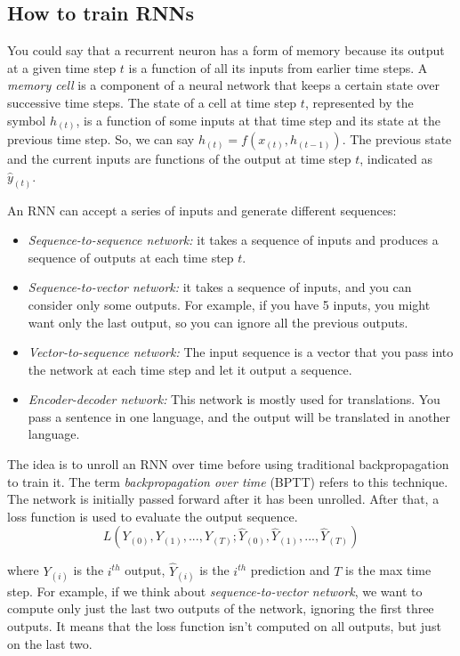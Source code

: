 \subsection{How to train RNNs}
You could say that a recurrent neuron has a form of memory because its output at a given time step $t$ is a function of all its inputs from earlier time steps. A \textit{memory cell} is a component of a neural network that keeps a certain state over successive time steps.
The state of a cell at time step $t$, represented by the symbol $h_{(t)}$, is a function of some inputs at that time step and its state at the previous time step.
So, we can say $h_{(t)} = f\left(x_{(t)}, h_{(t-1)}\right)$. The previous state and the current inputs are functions of the output at time step $t$, indicated as $\hat{y}_{(t)}$.

\hspace{1cm}

An RNN can accept a series of inputs and generate different sequences:
\begin{itemize}
    \item \textit{Sequence-to-sequence network:} it takes a sequence of inputs and produces a sequence of outputs at each time step $t$.
    \item \textit{Sequence-to-vector network:} it takes a sequence of inputs, and you can consider only some outputs. For example, if you have 5 inputs, you might want only the last output, so you can ignore all the previous outputs.
    \item \textit{Vector-to-sequence network:} The input sequence is a vector that you pass into the network at each time step and let it output a sequence. 
    \item \textit{Encoder-decoder network:} This network is mostly used for translations. You pass a sentence in one language, and the output will be translated in another language. 
\end{itemize}

The idea is to unroll an RNN over time before using traditional backpropagation to train it. The term \textit{backpropagation over time} (BPTT) refers to this technique. The network is initially passed forward after it has been unrolled. After that, a loss function is used to evaluate the output sequence. 
\begin{equation}
    L(Y_{(0)}, Y_{(1)}, ...,Y_{(T)}; \hat{Y}_{(0)}, \hat{Y}_{(1)}, ...,\hat{Y}_{(T)})
\end{equation}

where $Y_{(i)}$ is the $i^{th}$ output, $\hat{Y}_{(i)}$ is the $i^{th}$ prediction and $T$ is the max time step. 
For example, if we think about \textit{sequence-to-vector network}, we want to compute only just the last two outputs of the network, ignoring the first three outputs. It means that the loss function isn't computed on all outputs, but just on the last two.

